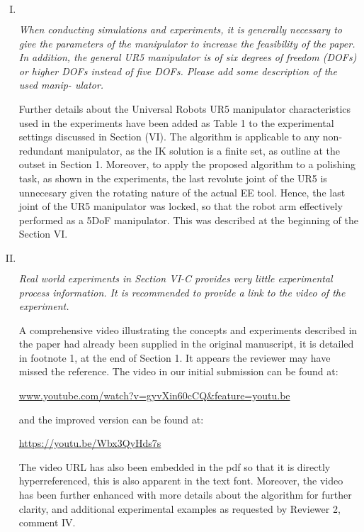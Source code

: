 \documentclass[11pt]{article}
\newenvironment{reviewer}
{\begin{mdframed}[roundcorner = 10pt,fontcolor=blue!70!black]\itshape}
{\end{mdframed}}
\begin{document}
\begin{enumerate}[I.]
  
  
  
  \item $ $
  \begin{reviewer}
    When conducting simulations and experiments, it is generally necessary to give the parameters of the manipulator to increase the feasibility of the paper. In addition, the general UR5 manipulator is of six degrees of freedom (DOFs) or higher DOFs instead of five DOFs. Please add some description of the used manip-
ulator.
  \end{reviewer}
  \noindent Further details about the Universal Robots UR5 manipulator characteristics used in the experiments have been added as Table 1 to the experimental settings discussed in Section (VI). 
  The algorithm is applicable to any non-redundant manipulator, as the IK solution is a finite set, as outline at the outset in Section 1. Moreover, to apply the proposed algorithm to a polishing task, as shown in the experiments, the last revolute joint of the UR5 is unnecesary given the rotating nature of the actual EE tool. Hence, the last joint of the UR5 manipulator was locked, so that the robot arm effectively performed as a 5DoF manipulator. This was described at the beginning of the Section VI.
  
  \item $ $
  \begin{reviewer}
   Real world experiments in Section VI-C provides very little experimental process information. It is recommended to provide a link to the video of the experiment.
  \end{reviewer}
  \noindent A comprehensive video illustrating the concepts and experiments described in the paper had already been supplied in the original manuscript, it is detailed in footnote 1, at the end of Section 1. It appears the reviewer may have missed the reference. 
The video in our initial submission can be found at: 

\url{www.youtube.com/watch?v=gyvXin60cCQ\&feature=youtu.be}

and the improved version can be found at: 

\url{https://youtu.be/Wbx3QyHds7s}

The video URL has also been embedded in the pdf so that it is directly hyperreferenced, this is also apparent in the text font. 
Moreover, the video has been further enhanced with more details about the algorithm for further clarity, and additional experimental examples as requested by Reviewer 2, comment IV.
  

\end{enumerate}
\end{document}
